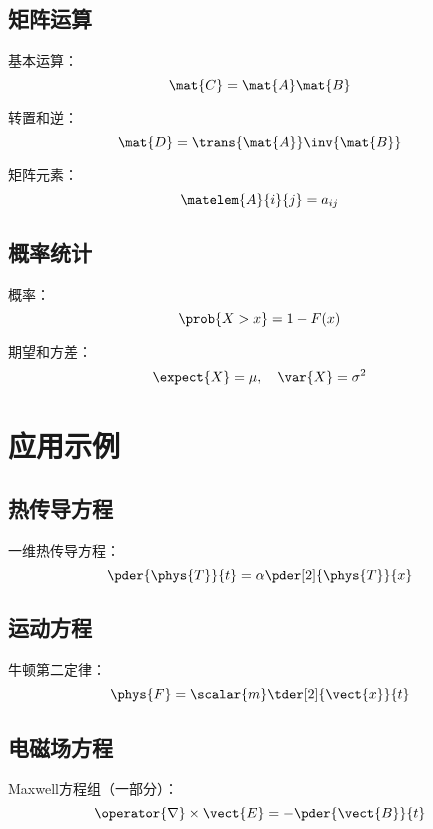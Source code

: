 \documentclass{article}
\begin{document}
\subsection{矩阵运算}

基本运算：
\[
    \mat{C} = \mat{A}\mat{B}
\]

转置和逆：
\[
    \mat{D} = \trans{\mat{A}}\inv{\mat{B}}
\]

矩阵元素：
\[
    \matelem{A}{i}{j} = a_{ij}
\]

\subsection{概率统计}

概率：
\[
    \prob{X > x} = 1 - F(x)
\]

期望和方差：
\[
    \expect{X} = \mu, \quad \var{X} = \sigma^2
\]

\section{应用示例}

\subsection{热传导方程}
一维热传导方程：
\[
    \pder{\phys{T}}{t} = \alpha \pder[2]{\phys{T}}{x}
\]

\subsection{运动方程}
牛顿第二定律：
\[
    \phys{F} = \scalar{m}\tder[2]{\vect{x}}{t}
\]

\subsection{电磁场方程}
Maxwell方程组（一部分）：
\[
    \operator{\nabla} \times \vect{E} = -\pder{\vect{B}}{t}
\]
\end{document}
